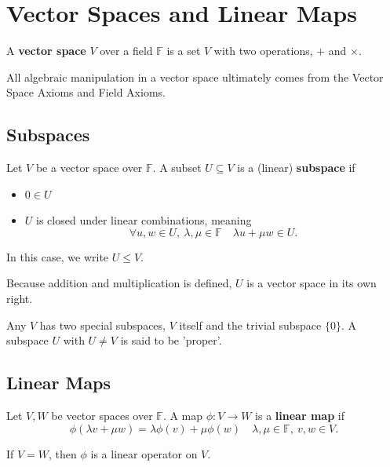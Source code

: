 \section{Vector Spaces and Linear Maps}
\begin{definition}
  A {\bf vector space} $V$ over a field $\mathbb{F}$ is a set $V$ with two operations, $+$ and $\times$.
\end{definition}

All algebraic manipulation in a vector space ultimately comes from the Vector Space Axioms and Field Axioms.

\subsection{Subspaces}

\begin{definition}
  Let $V$ be a vector space over $\mathbb{F}$. A subset $U \subseteq V$ is a (linear) {\bf subspace} if
    \begin{itemize}
        \item $0 \in U$
        \item $U$ is closed under linear combinations, meaning
            \[\forall u,w \in U, \ \lambda, \mu \in \mathbb{F} \quad \lambda u + \mu w \in U.\]
    \end{itemize}
    In this case, we write $U \leq V$.
\end{definition}

\begin{remark}
    Because addition and multiplication is defined, $U$ is a vector space in its own right.

    Any $V$ has two special subspaces, $V$ itself and the trivial subspace $\{0\}$. A subspace $U$ with $U \not = V$ is said to be 'proper'.
\end{remark}

\subsection{Linear Maps}
\begin{definition}
  Let $V,W$ be vector spaces over $\mathbb{F}$. A map $\phi : V \rightarrow W$ is a {\bf linear map} if
    \[\phi(\lambda v + \mu w) = \lambda \phi(v) + \mu \phi(w) \quad \lambda, \mu \in \mathbb{F}, \ v,w \in V.\]

    If $V = W$, then $\phi$ is a linear operator on $V$.
\end{definition}
